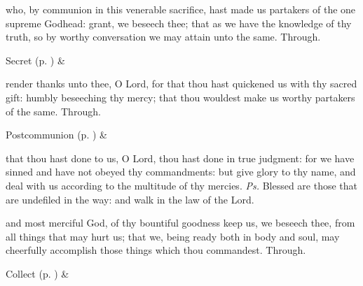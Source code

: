 
\secret
{} who, by communion in this venerable sacrifice, hast made us partakers of the one supreme Godhead: grant, we beseech thee; that as we have the knowledge of thy truth, so by worthy conversation we may attain unto the same. Through.
\begin{rubric}
     Secret  (p. \pageref{SPSaints}) \&  
\end{rubric}


\postcommunion
{} render thanks unto thee, O Lord, for that thou hast quickened us with thy sacred gift: humbly beseeching thy mercy; that thou wouldest make us worthy partakers of the same. Through.
\begin{rubric}
     Postcommunion  (p. \pageref{SPSaints}) \&  
\end{rubric}


\clearpage
{}


\introit
{} that thou hast done to us, O Lord, thou hast done in true judgment: for we have sinned and have not obeyed thy commandments: but give glory to thy name, and deal with us according to the multitude of thy mercies. \textit{Ps.} Blessed are those that are undefiled in the way: and walk in the law of the Lord.

\collect
{} and most merciful God, of thy bountiful goodness keep us, we beseech thee, from all things that may hurt us; that we, being ready both in body and soul, may cheerfully accomplish those things which thou commandest. Through.
\begin{rubric}
     Collect  (p. \pageref{SPSaints}) \&  
\end{rubric}

